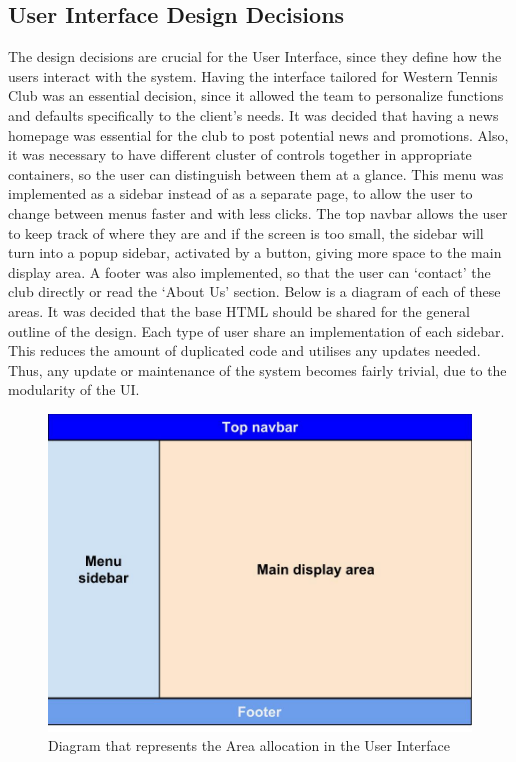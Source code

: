 \documentclass{l3proj}
\begin{document}
\subsection{User Interface Design Decisions}
The design decisions are crucial for the User Interface, since they define how the users interact with the system. Having the interface tailored for Western Tennis Club was an essential decision, since it allowed the team to personalize functions and defaults specifically to the client's needs. It was decided that having a news homepage was essential for the club to post potential news and promotions. Also, it was necessary to have different cluster of controls together in appropriate containers, so the user can distinguish between them at a glance. This menu was implemented as a sidebar instead of as a separate page, to allow the user to change between menus faster and with less clicks. The top navbar allows the user to keep track of where they are and if the screen is too small, the sidebar will turn into a popup sidebar, activated by a button, giving more space to the main display area. A footer was also implemented, so that the user can `contact' the club directly or read the `About Us' section. Below is a diagram of each of these areas. It was decided that the base HTML should be shared for the general outline of the design. Each type of user share an implementation of each sidebar. This reduces the amount of duplicated code and utilises any updates needed. Thus, any update or maintenance of the system becomes fairly trivial, due to the modularity of the UI.
{
\begin{figure}[h]
\caption{Diagram that represents the Area allocation in the User Interface}
\centering
\includegraphics[scale=0.20]{AreaDiagramTP3.jpg}
\end{figure}
}
\end{document}
